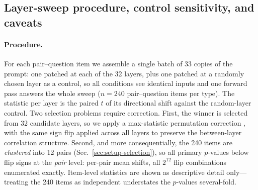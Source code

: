 \subsection{Layer-sweep procedure, control sensitivity, and caveats}
\label{app:sweep-procedure}
\paragraph{Procedure.}
For each pair--question item we assemble a single
batch of 33 copies of the prompt: one patched at each of the 32 layers,
plus one patched at a randomly chosen layer as a control, so all
conditions see identical inputs and one forward pass answers the whole
sweep ($n{=}240$ pair--question items per type). The statistic per layer
is the paired $t$ of its directional shift against the random-layer
control. Two selection problems require correction. First, the winner is
selected from 32 candidate layers, so we apply a max-statistic permutation
correction \citep{nichols2002}, with the same sign flip applied across all
layers to preserve the between-layer correlation structure. Second, and
more consequentially, the 240 items are \emph{clustered} into 12 pairs
(Sec.~\ref{sec:setup-selection}), so all primary $p$-values below flip
signs at the \emph{pair} level: per-pair mean shifts, all $2^{12}$ flip
combinations enumerated exactly. Item-level statistics are shown as
descriptive detail only---treating the 240 items as independent
understates the $p$-values several-fold.

